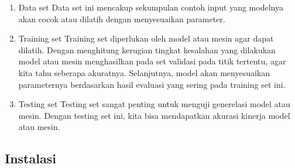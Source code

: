 \begin{enumerate}
\begin{enumerate}
\item
Data set
\subitem
Data set ini mencakup sekumpulan contoh input yang modelnya akan cocok atau dilatih dengan menyesuaikan parameter.
\item
Training set
\subitem
Training set diperlukan oleh model atau mesin agar dapat dilatih. Dengan menghitung kerugian tingkat kesalahan yang dilakukan model atau mesin menghasilkan pada set validasi pada titik tertentu, agar kita tahu seberapa akuratnya. Selanjutnya, model akan menyesuaikan parameternya berdasarkan hasil evaluasi yang sering pada training set ini.
\item
Testing set
\subitem
Testing set sangat penting untuk menguji generelasi model atau mesin. Dengan testing set ini, kita bisa mendapatkan akurasi kinerja model atau mesin.
\end{enumerate}

\end{enumerate}

\subsection{Instalasi}
